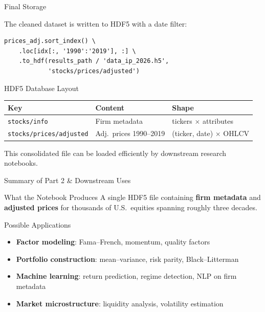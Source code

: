 \documentclass[aspectratio=169]{beamer}
\begin{document}
%
%
\begin{frame}[fragile]{Final Storage}

The cleaned dataset is written to HDF5 with a date filter:

\begin{lstlisting}
prices_adj.sort_index() \
    .loc[idx[:, '1990':'2019'], :] \
    .to_hdf(results_path / 'data_ip_2026.h5',
            'stocks/prices/adjusted')
\end{lstlisting}

\vspace{0.3cm}

\begin{block}{HDF5 Database Layout}
\centering
\begin{tabular}{lll}
\toprule
\textbf{Key} & \textbf{Content} & \textbf{Shape} \\
\midrule
\texttt{stocks/info} & Firm metadata & tickers $\times$ attributes \\
\texttt{stocks/prices/adjusted} & Adj.\ prices 1990--2019 & (ticker, date) $\times$ OHLCV \\
\bottomrule
\end{tabular}
\end{block}

\vspace{0.3cm}

This consolidated file can be loaded efficiently by downstream research notebooks.

\end{frame}
%
%
\begin{frame}{Summary of Part 2 \& Downstream Uses}

\begin{block}{What the Notebook Produces}
A single HDF5 file containing \textbf{firm metadata} and \textbf{adjusted prices} for thousands of U.S.\ equities spanning roughly three decades.
\end{block}

\vspace{0.3cm}

\begin{block}{Possible Applications}
\begin{itemize}
  \item \textbf{Factor modeling}: Fama--French, momentum, quality factors
  \item \textbf{Portfolio construction}: mean--variance, risk parity, Black--Litterman
  \item \textbf{Machine learning}: return prediction, regime detection, NLP on firm metadata
  \item \textbf{Market microstructure}: liquidity analysis, volatility estimation
\end{itemize}
\end{block}

\end{frame}
\end{document}
